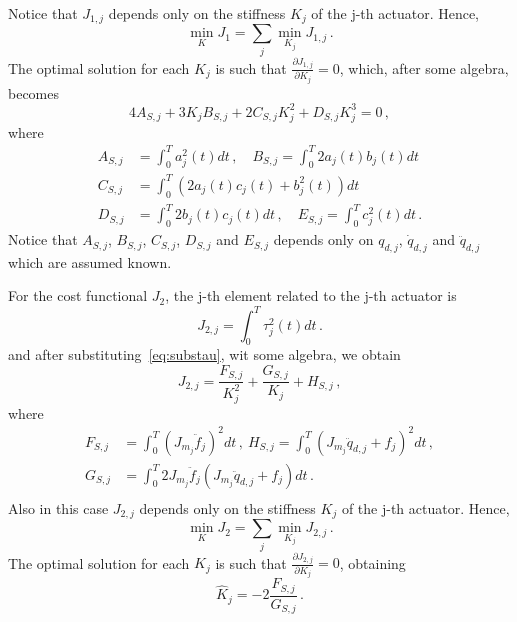 Notice that $J_{1,j}$ depends only on the stiffness $K_j$ of the j-th actuator. Hence, 
\[
\min_K{J_1} = \sum_j{\min_{K_j}{J_{1,j}}}\,.
\]
The optimal solution for each $K_j$ is such that $\frac{\partial J_{1,j}}{\partial K_j} = 0$, which, after some algebra, becomes
\begin{equation}
4 A_{S,j} + 3 K_j B_{S,j} + 2 C_{S,j} K_j^2 + D_{S,j} K_j^{3} = 0\,,
\label{eq:SEA_J1_OptimalK}
\end{equation}
where
\[
\begin{aligned}
A_{S,j} &= \int_0^T a^2_j(t)dt\,,\quad B_{S,j} = \int_0^T 2a_j(t)b_j(t)dt\\
C_{S,j} &= \int_0^T{(2a_j(t)c_j(t)+b^2_j(t))}dt\\
D_{S,j} &= \int_0^T{2b_j(t)c_j(t)}dt\,,\quad E_{S,j} = \int_0^T{c^2_j(t)}dt\,.
\end{aligned}
\]
Notice that $A_{S,j}$, $B_{S,j}$, $C_{S,j}$, $D_{S,j}$ and $E_{S,j}$ depends only on $q_{d,j}$, $\dot q_{d,j}$ and $\ddot q_{d,j}$ which are assumed known.

For the cost functional $J_2$, the j-th element related to the j-th actuator is
\begin{equation*}
J_{2,j}=\int_0^T{\tau^{2}_{j}(t)dt}\, .
\label{eq:J2j}
\end{equation*}
and after substituting~\eqref{eq:substau}, wit some algebra, we obtain
\begin{equation*}
J_{2,j} = \frac{F_{S,j}}{K_j^2} + \frac{G_{S,j}}{K_j} + H_{S,j} \,,
\label{eq:J2SEA}
\end{equation*}
where
{\small
\[
\begin{aligned}
F_{S,j} &= \int_0^T{(J_{m_j} \ddot{f}_j)^2 dt}\,,\ 
H_{S,j} = \int_0^T{(J_{m_j} \ddot q_{d,j} + f_j)^2 dt}\,,\\
G_{S,j} &= \int_0^T{2J_{m_j} \ddot{f}_j (J_{m_j} \ddot q_{d,j} + f_j) dt}\,.\\
\end{aligned}
\]}
Also in this case $J_{2,j}$ depends only on the stiffness $K_j$ of the j-th actuator. Hence, 
\[
\min_K{J_2} = \sum_j{\min_{K_j}{J_{2,j}}}\,.
\]
The optimal solution for each $K_j$ is such that $\frac{\partial J_{2,j}}{\partial K_j} = 0$,
obtaining
\begin{equation}
\label{eq:SEAOptimalK_J2}
\hat K_j=-2\frac{F_{S,j}}{G_{S,j}}\,.
\end{equation}



